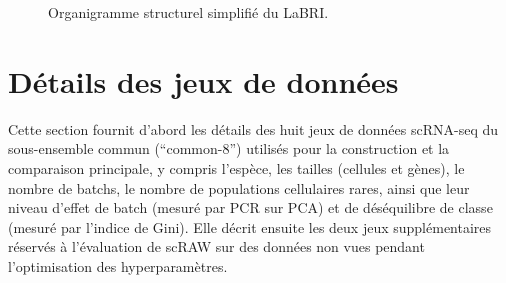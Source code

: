 \begin{figure}[H]
  \caption{Organigramme structurel simplifié du LaBRI.}
  \label{fig:organigramme_labri}
\end{figure}

\newpage
\section{Détails des jeux de données}
\label{annexe:datasets}

Cette section fournit d'abord les détails des huit jeux de données scRNA-seq du sous-ensemble commun (``common-8'') utilisés pour la construction et la comparaison principale, y compris l'espèce, les tailles (cellules et gènes), le nombre de batchs, le nombre de populations cellulaires rares, ainsi que leur niveau d'effet de batch (mesuré par PCR sur PCA) et de déséquilibre de classe (mesuré par l'indice de Gini). Elle décrit ensuite les deux jeux supplémentaires réservés à l'évaluation de scRAW sur des données non vues pendant l'optimisation des hyperparamètres.

